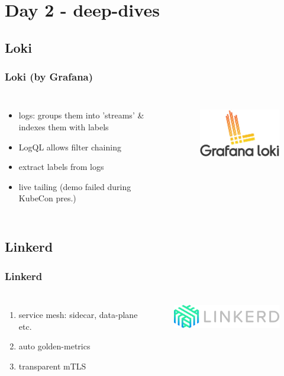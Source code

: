 \documentclass[default]{beamer}
\begin{document}
\section{Day 2 - deep-dives}


\subsection{Loki}
\begin{frame}
  \frametitle{Loki (by Grafana)\footnotemark}
  \begin{columns}
    \column{2in}
    \begin{itemize}
      \item logs: groups them into 'streams' \& indexes them with labels
      \item LogQL allows filter chaining
      \item extract labels from logs
      \item live tailing (demo failed during KubeCon pres.)
    \end{itemize}
    \column{2in}
    \begin{figure}
      \includegraphics[width=150pt,height=80pt]{static/loki.png}
    \end{figure}
  \end{columns}
\end{frame}

\subsection{Linkerd}
\begin{frame}
  \frametitle{Linkerd\footnotemark}
  \begin{columns}
    \column{2in}
    \begin{enumerate}
      \item service mesh: sidecar, data-plane etc.
      \item auto golden-metrics
      \item transparent mTLS
    \end{enumerate}
    \column{2in}
    \begin{figure}
      \includegraphics[width=150pt,height=40pt]{static/linkerd.png}
    \end{figure}
  \end{columns}
\end{frame}
\end{document}
